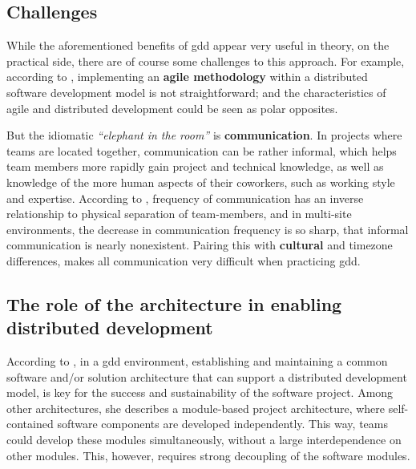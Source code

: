 \subsection{Challenges}

While the aforementioned benefits of \gls{gdd} appear very useful in theory, on
the practical side, there are of course some challenges to this approach. For
example, according to \textcite{Smite_etal_2010}, implementing an \textbf{agile
methodology} within a distributed software development model is not
straightforward; and the characteristics of agile and distributed development
could be seen as polar opposites. 

But the idiomatic \textit{``elephant in the room''} is \textbf{communication}.
In projects where teams are located together, communication can be rather
informal, which helps team members more rapidly gain project and technical
knowledge, as well as knowledge of the more human aspects of their coworkers,
such as working style and expertise. According to \textcite{Sengupta_2006},
frequency of communication has an inverse relationship to physical separation of
team-members, and in multi-site environments, the decrease in communication
frequency is so sharp, that informal communication is nearly nonexistent.
Pairing this with \textbf{cultural} and timezone differences, makes all
communication very difficult when practicing \gls{gdd}.


\subsection{The role of the architecture in enabling distributed development}

According to \textcite{Yuhong_2008}, in a \gls{gdd} environment, establishing
and maintaining a common software and/or solution architecture that can support
a distributed development model, is key for the success and sustainability of
the software project. Among other architectures, she describes a module-based
project architecture, where self-contained software components are developed
independently. This way, teams could develop these modules simultaneously,
without a large interdependence on other modules. This, however, requires strong
decoupling of the software modules.